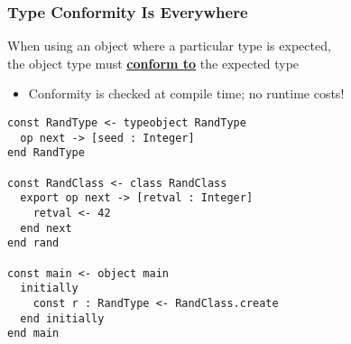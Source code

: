 \begin{frame}[fragile]

\frametitle{Type Conformity Is Everywhere}

\begin{center}

When using an object where a particular type is expected,\\ the object
type must \textbf{\underline{conform to}} the expected type

\end{center}

\begin{itemize}

\item Conformity is checked at compile time; no runtime costs!

\end{itemize}

\begin{lstlisting}
const RandType <- typeobject RandType
  op next -> [seed : Integer]
end RandType

const RandClass <- class RandClass
  export op next -> [retval : Integer]
    retval <- 42
  end next
end rand

const main <- object main
  initially
    const r : RandType <- RandClass.create
  end initially
end main
\end{lstlisting}

\end{frame}



